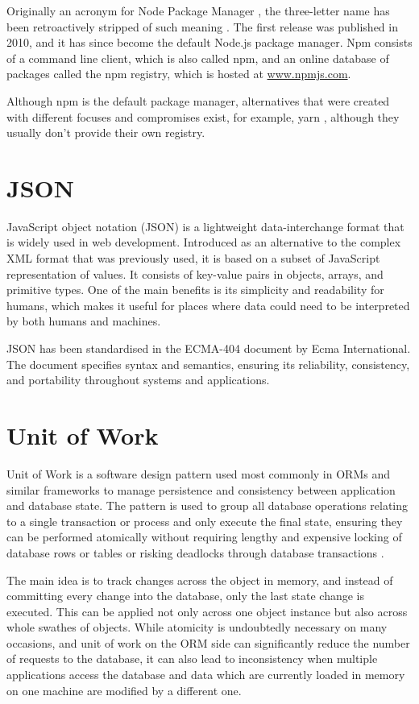 Originally an acronym for Node Package Manager \cite{npm-old-readme}, the
three-letter name has been retroactively stripped of such meaning
\cite{npm-usage}. The first release was published in 2010, and it has since
become the default Node.js package manager. Npm consists of a command line
client, which is also called npm, and an online database of packages called the
npm registry, which is hosted at \url{www.npmjs.com}. 

Although npm is the default package manager, alternatives that were created with
different focuses and compromises exist, for example, yarn \cite{Yarn}, although
they usually don't provide their own registry.

\section*{JSON}
JavaScript object notation (JSON) is a lightweight data-interchange format that
is widely used in web development. Introduced as an alternative to the complex
XML format that was previously used, it is based on a subset of JavaScript
representation of values. It consists of key-value pairs in objects, arrays, and
primitive types. One of the main benefits is its simplicity and readability for
humans, which makes it useful for places where data could need to be interpreted
by both humans and machines.

JSON has been standardised in the ECMA-404 \cite{ECMA-404} document by Ecma
International. The document specifies syntax and semantics, ensuring its
reliability, consistency, and portability throughout systems and applications.

\section*{Unit of Work}
Unit of Work is a software design pattern used most commonly in ORMs and similar
frameworks to manage persistence and consistency between application and
database state. The pattern is used to group all database operations relating to
a single transaction or process and only execute the final state, ensuring they
can be performed atomically without requiring lengthy and expensive locking of
database rows or tables or risking deadlocks through database transactions
\cite[p.~184]{fowler-patterns-2003}.

The main idea is to track changes across the object in memory, and instead of
committing every change into the database, only the last state change is
executed. This can be applied not only across one object instance but also
across whole swathes of objects. While atomicity is undoubtedly necessary on
many occasions, and unit of work on the ORM side can significantly reduce the
number of requests to the database, it can also lead to inconsistency when
multiple applications access the database and data which are currently loaded in
memory on one machine are modified by a different one.

